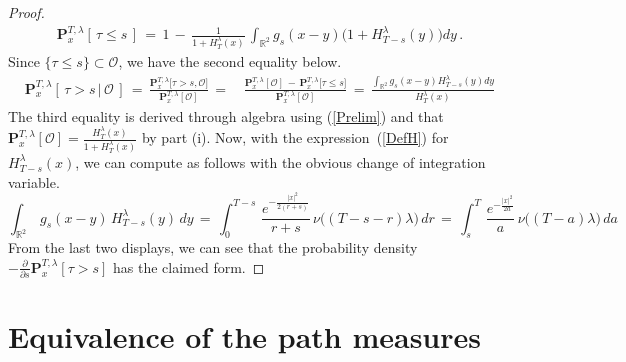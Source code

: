 \documentclass[10pt]{article}
\numberwithin{equation}{section}
\theoremstyle{definition}
\newcommand{\R}{{\mathbb R}}
\begin{document}
\begin{proof}
\begin{align}\label{Prelim}
\mathbf{P}_{x }^{T,\lambda }[\, \tau \leq  s  \,] \,=\,1\,-\,\frac{1}{1 +H_T^{\lambda}(x)  }\, \int_{\R^2}g_{s}(x-y) \big( 1+H^{\lambda}_{T-s}(y) \big)  dy \,. \end{align}
Since  $\{\tau \leq  s\}\subset \mathcal{O} $,   we have the second equality below. 
\begin{align*}
\mathbf{P}_{x  }^{T,\lambda}[ \,\tau > s  \,|\, \mathcal{O}\, ]\,=\,  \frac{ \mathbf{P}_{x }^{T,\lambda }\big[ \tau > s ,\mathcal{O}  \big]  }{  \mathbf{P}_{x }^{T,\lambda }[ \mathcal{O}  ]  } \,=\,&  \frac{ \mathbf{P}_{x  }^{T,\lambda}[ \mathcal{O} ]\,-\,\mathbf{P}_{x  }^{T,\lambda}\big[ \tau \leq  s   \big]  }{  \mathbf{P}_{x  }^{T,\lambda}[ \mathcal{O}  ]  } \,=\, \frac{\int_{\R^2}g_s(x-y)H_{T-s}^{\lambda}(y)dy   }{ H_T^{\lambda}(x) }    \end{align*}
The third equality is derived through algebra using (\ref{Prelim}) and that $\mathbf{P}_{x  }^{T,\lambda}[ \mathcal{O}  ] =\frac{H_T^{\lambda}(x) }{1 +H_T^{\lambda}(x)  }$ by part (i).  Now, with the expression~(\ref{DefH}) for $H_{T-s}^{\lambda}(x) $, we can compute as follows with the obvious   change of integration variable.
$$ \int_{\R^2}\,g_s(x-y)\,H_{T-s}^{\lambda}(y)\,dy  \,=\,\int_0^{T-s}\,\frac{ e^{- \frac{|x|^2}{2(r+s  )} }  }{r+s }\,\nu\big((T-s-r)\lambda\big)\,dr \,=\,\int_s^{T}\,\frac{ e^{ -\frac{|x|^2}{2a } }  }{a }\,\nu\big((T-a)\lambda\big)\,da $$
From the last two displays, we can see that the probability density $-\frac{\partial}{\partial s}\mathbf{P}_{x }^{T,\lambda }[ \tau >  s  ]$ has the claimed form.
\end{proof}





\section{Equivalence of the path measures} \label{SectionGirsanov}
\end{document}

